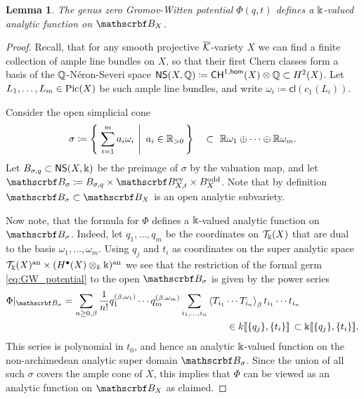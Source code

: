 \documentclass[twoside,leqno]{article}
\numberwithin{equation}{section}
\theoremstyle{plain}
\newtheorem{lemma}[equation]{Lemma}
\theoremstyle{definition}
\begin{document}
\begin{lemma} \label{lem:GW-potential_analytic}
The genus zero Gromov-Witten potential $\Phi(q,t)$ defines a $\Bbbk$-valued  analytic function on $\omB_{X}$.
\end{lemma}
\begin{proof} Recall, that for any smooth projective $\overline{\mathcal K}$-variety $X$  we can find a finite collection of ample line bundles on $X$, so that their first Chern classes form a basis of the  $\mathbb Q$-N\'{e}ron-Severi space $\mathsf{NS}(X,\mathbb Q) \coloneqq \mathsf{CH}^{1,\mathsf{hom}}(X)\otimes \mathbb Q \subset H^2(X)$.  
Let $L_{1}, \ldots, L_{m} \in \operatorname{Pic}(X)$ be such ample line bundles, and write $\omega_{i} \coloneqq \mathsf{cl}(c_{1}(L_{i}))$. 

Consider the open simplicial cone 
\[
\sigma \coloneqq \left\{\left. \, \sum_{i = 1}^{m} a_{i}\omega_{i} \ \right| \ a_{i} \in \bbR_{> 0}\, \right\} \quad \subset \ \bbR\omega_{1}\oplus \cdots \oplus \bbR\omega_{m}.
\]
Let $B_{\sigma,q} \subset \mathsf{NS}(X,\Bbbk)$ be the preimage of $\sigma$ by the valuation map, and let  
$\omB_{\sigma} \coloneqq B_{\sigma,q} \times \omB_{X,t}^{\even} \times B^{\odd}_{X}$. Note that by definition $\omB_{\sigma} \subset \omB_{X}$
is an open analytic subvariety.

Now note, that the formula for  $\Phi$ defines a $\Bbbk$-valued analytic function on $\omB_{\sigma}$. Indeed, let  
$q_{1}, \ldots, q_{m}$ be the coordinates on $\mathcal{T}_{\Bbbk}(X)$  that are dual to the basis 
$\omega_{1}, \ldots, \omega_{m}$. Using $q_{j}$ and $t_{i}$ as coordinates on the super analytic space $\mathcal{T}_{\Bbbk}(X)^{\operatorname{an}}\times (H^{\bullet}(X)\otimes_{k} \Bbbk)^{\operatorname{an}}$ we see that the restriction of the formal germ 
\eqref{eq:GW_potential} to the open $\omB_{\sigma}$ is given by the power series
  \[ 
\begin{aligned}
\Phi|_{\omB_{\sigma}} = \sum_{n\ge 0,\beta} \frac{1}{n!} q_1^{(\beta,\omega_1)}\cdots q_m^{(\beta,\omega_m)} \sum_{i_1,\dots,i_n} & \braket{T_{i_1}\cdots T_{i_n}}_\beta t_{i_1}\cdots t_{i_n} \\ 
& \qquad \in k\dbb{\{q_j\},\{t_i\}}  \, \subset 
\bbk\dbb{\{q_j\},\{t_i\}}.
\end{aligned}
\]
This series is polynomial in $t_0$, and hence an analytic $\Bbbk$-valued function on  the non-archimedean analytic super domain $\omB_{\sigma}$. Since the union of all such $\sigma$ covers the ample cone of $X$, this implies that $\Phi$ can be viewed as an analytic function on $\omB_{X}$  as claimed.
\end{proof}
\end{document}

